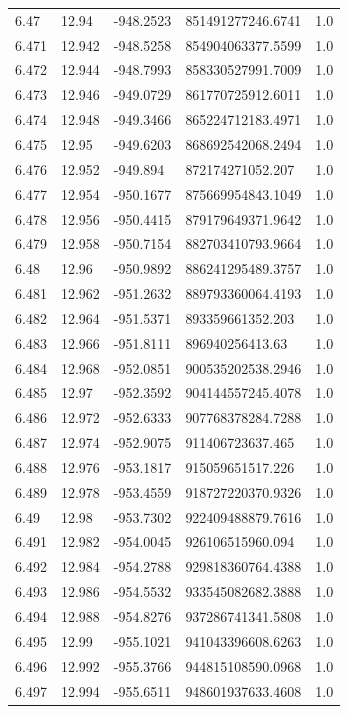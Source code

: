 \begin{tabular}{lllll}
6.47 & 12.94 & -948.2523 & 851491277246.6741 & 1.0 \\
6.471 & 12.942 & -948.5258 & 854904063377.5599 & 1.0 \\
6.472 & 12.944 & -948.7993 & 858330527991.7009 & 1.0 \\
6.473 & 12.946 & -949.0729 & 861770725912.6011 & 1.0 \\
6.474 & 12.948 & -949.3466 & 865224712183.4971 & 1.0 \\
6.475 & 12.95 & -949.6203 & 868692542068.2494 & 1.0 \\
6.476 & 12.952 & -949.894 & 872174271052.207 & 1.0 \\
6.477 & 12.954 & -950.1677 & 875669954843.1049 & 1.0 \\
6.478 & 12.956 & -950.4415 & 879179649371.9642 & 1.0 \\
6.479 & 12.958 & -950.7154 & 882703410793.9664 & 1.0 \\
6.48 & 12.96 & -950.9892 & 886241295489.3757 & 1.0 \\
6.481 & 12.962 & -951.2632 & 889793360064.4193 & 1.0 \\
6.482 & 12.964 & -951.5371 & 893359661352.203 & 1.0 \\
6.483 & 12.966 & -951.8111 & 896940256413.63 & 1.0 \\
6.484 & 12.968 & -952.0851 & 900535202538.2946 & 1.0 \\
6.485 & 12.97 & -952.3592 & 904144557245.4078 & 1.0 \\
6.486 & 12.972 & -952.6333 & 907768378284.7288 & 1.0 \\
6.487 & 12.974 & -952.9075 & 911406723637.465 & 1.0 \\
6.488 & 12.976 & -953.1817 & 915059651517.226 & 1.0 \\
6.489 & 12.978 & -953.4559 & 918727220370.9326 & 1.0 \\
6.49 & 12.98 & -953.7302 & 922409488879.7616 & 1.0 \\
6.491 & 12.982 & -954.0045 & 926106515960.094 & 1.0 \\
6.492 & 12.984 & -954.2788 & 929818360764.4388 & 1.0 \\
6.493 & 12.986 & -954.5532 & 933545082682.3888 & 1.0 \\
6.494 & 12.988 & -954.8276 & 937286741341.5808 & 1.0 \\
6.495 & 12.99 & -955.1021 & 941043396608.6263 & 1.0 \\
6.496 & 12.992 & -955.3766 & 944815108590.0968 & 1.0 \\
6.497 & 12.994 & -955.6511 & 948601937633.4608 & 1.0 \\

\end{tabular}

